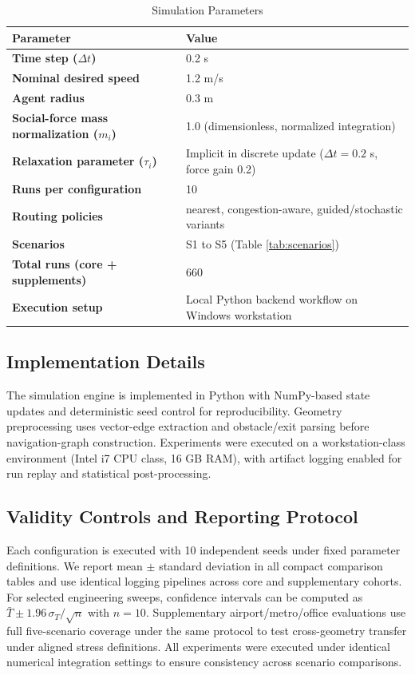 \documentclass[journal]{IEEEtran}
\begin{document}
\begin{table}[t]
\centering
\caption{Simulation Parameters}
\label{tab:sim_params}
{\footnotesize
\setlength{\tabcolsep}{3pt}
\begin{tabular}{>{\bfseries}p{2.25cm} p{4.55cm}}
\toprule
Parameter & Value \\
\midrule
Time step ($\Delta t$) & 0.2 s \\
Nominal desired speed & 1.2 m/s \\
Agent radius & 0.3 m \\
Social-force mass normalization ($m_i$) & 1.0 (dimensionless, normalized integration) \\
Relaxation parameter ($\tau_i$) & Implicit in discrete update ($\Delta t=0.2$ s, force gain 0.2) \\
Runs per configuration & 10 \\
Routing policies & nearest, congestion-aware, guided/stochastic variants \\
Scenarios & S1 to S5 (Table \ref{tab:scenarios}) \\
Total runs (core + supplements) & 660 \\
Execution setup & Local Python backend workflow on Windows workstation \\
\bottomrule
\end{tabular}
}
\end{table}

\subsection{Implementation Details}
The simulation engine is implemented in Python with NumPy-based state updates and deterministic seed control for reproducibility. Geometry preprocessing uses vector-edge extraction and obstacle/exit parsing before navigation-graph construction. Experiments were executed on a workstation-class environment (Intel i7 CPU class, 16 GB RAM), with artifact logging enabled for run replay and statistical post-processing.

\subsection{Validity Controls and Reporting Protocol}
Each configuration is executed with 10 independent seeds under fixed parameter definitions. We report mean $\pm$ standard deviation in all compact comparison tables and use identical logging pipelines across core and supplementary cohorts. For selected engineering sweeps, confidence intervals can be computed as $\bar{T} \pm 1.96\,\sigma_T/\sqrt{n}$ with $n=10$. Supplementary airport/metro/office evaluations use full five-scenario coverage under the same protocol to test cross-geometry transfer under aligned stress definitions.
All experiments were executed under identical numerical integration settings to ensure consistency across scenario comparisons.
\end{document}
